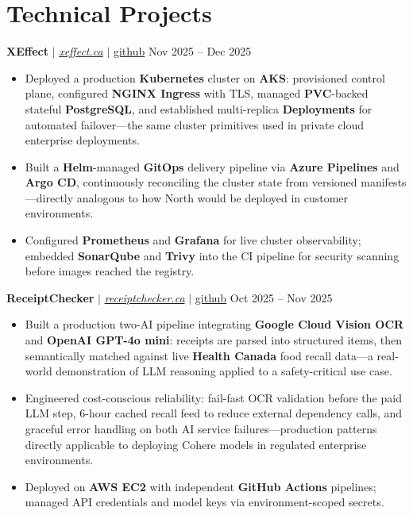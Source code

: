 \documentclass[11pt,a4paper]{article}
\begin{document}
\section{Technical Projects}

\textbf{XEffect} $|$ \href{https://www.xeffect.ca/app}{\emph{xeffect.ca}} $|$ \href{https://github.com/bhat0155/xeffect}{\small github} \hfill Nov 2025 -- Dec 2025
\begin{itemize}
    \item Deployed a production \textbf{Kubernetes} cluster on \textbf{AKS}: provisioned control plane, configured \textbf{NGINX Ingress} with TLS, managed \textbf{PVC}-backed stateful \textbf{PostgreSQL}, and established multi-replica \textbf{Deployments} for automated failover---the same cluster primitives used in private cloud enterprise deployments.
    \item Built a \textbf{Helm}-managed \textbf{GitOps} delivery pipeline via \textbf{Azure Pipelines} and \textbf{Argo CD}, continuously reconciling the cluster state from versioned manifests---directly analogous to how North would be deployed in customer environments.
    \item Configured \textbf{Prometheus} and \textbf{Grafana} for live cluster observability; embedded \textbf{SonarQube} and \textbf{Trivy} into the CI pipeline for security scanning before images reached the registry.
\end{itemize}

\vspace{4pt}

\textbf{ReceiptChecker} $|$ \href{https://receiptchecker.ca/}{\emph{receiptchecker.ca}} $|$ \href{https://github.com/bhat0155/receipt-check}{\small github} \hfill Oct 2025 -- Nov 2025
\begin{itemize}
    \item Built a production two-AI pipeline integrating \textbf{Google Cloud Vision OCR} and \textbf{OpenAI GPT-4o mini}: receipts are parsed into structured items, then semantically matched against live \textbf{Health Canada} food recall data---a real-world demonstration of LLM reasoning applied to a safety-critical use case.
    \item Engineered cost-conscious reliability: fail-fast OCR validation before the paid LLM step, 6-hour cached recall feed to reduce external dependency calls, and graceful error handling on both AI service failures---production patterns directly applicable to deploying Cohere models in regulated enterprise environments.
    \item Deployed on \textbf{AWS EC2} with independent \textbf{GitHub Actions} pipelines; managed API credentials and model keys via environment-scoped secrets.
\end{itemize}
\end{document}
